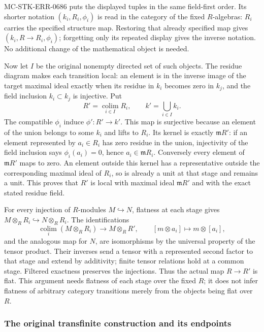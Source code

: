 MC-\AlgebraIdentifierBreak{}STK-\AlgebraIdentifierBreak{}ERR-\AlgebraIdentifierBreak{}0686 puts the displayed tuples in the same field-first order. Its shorter notation \((k_i,R_i,\phi_i)\) is read in the category of the fixed \(R\)-algebras: \(R_i\) carries the specified structure map. Restoring that already specified map gives \((k_i,R\to R_i,\phi_i)\); forgetting only its repeated display gives the inverse notation. No additional change of the mathematical object is needed.

Now let \(I\) be the original nonempty directed set of such objects. The residue diagram makes each transition local: an element is in the inverse image of the target maximal ideal exactly when its residue in \(k_i\) becomes zero in \(k_j\), and the field inclusion \(k_i\subset k_j\) is injective. Put \[
 R'=\operatorname*{colim}_{i\in I}R_i,\qquad k'=\bigcup_{i\in I}k_i.
\] The compatible \(\phi_i\) induce \(\phi':R'\to k'\). This map is surjective because an element of the union belongs to some \(k_i\) and lifts to \(R_i\). Its kernel is exactly \(\mathfrak mR'\): if an element represented by \(a_i\in R_i\) has zero residue in the union, injectivity of the field inclusion says \(\phi_i(a_i)=0\), hence \(a_i\in\mathfrak mR_i\). Conversely every element of \(\mathfrak mR'\) maps to zero. An element outside this kernel has a representative outside the corresponding maximal ideal of \(R_i\), so is already a unit at that stage and remains a unit. This proves that \(R'\) is local with maximal ideal \(\mathfrak mR'\) and with the exact stated residue field.

For every injection of \(R\)-modules \(M\hookrightarrow N\), flatness at each stage gives \(M\otimes_R R_i\hookrightarrow N\otimes_R R_i\). The identifications \[
 \operatorname*{colim}_i(M\otimes_R R_i)\longrightarrow
 M\otimes_R R',\qquad [m\otimes a_i]\longmapsto m\otimes[a_i],
\] and the analogous map for \(N\), are isomorphisms by the universal property of the tensor product. Their inverses send a tensor with a represented second factor to that stage and extend by additivity; finite tensor relations hold at a common stage. Filtered exactness preserves the injections. Thus the actual map \(R\to R'\) is flat. This argument needs flatness of each stage over the fixed \(R\); it does not infer flatness of arbitrary category transitions merely from the objects being flat over \(R\).

\subsubsection{The original transfinite construction and its endpoints}\label{algebra-proof-064-the-original-transfinite-construction-and-its-endpoints}

